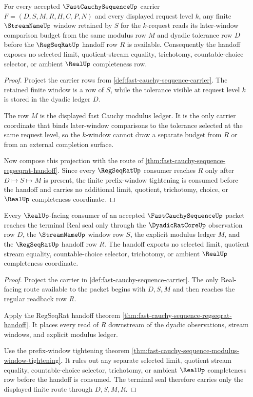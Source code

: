 \begin{theorem}
\label{thm:fast-cauchy-sequence-modulus-window-tightening}
For every accepted $\FastCauchySequenceUp$ carrier $F=(D,S,M,R,H,C,P,N)$ and every displayed request level $k$, any finite $\StreamNameUp$ window retained by $S$ for the $k$-request reads its later-window comparison budget from the same modulus row $M$ and dyadic tolerance row $D$ before the $\RegSeqRatUp$ handoff row $R$ is available. Consequently the handoff exposes no selected limit, quotient-stream equality, trichotomy, countable-choice selector, or ambient $\RealUp$ completeness row.
\end{theorem}
\begin{proof}
Project the carrier rows from \autoref{def:fast-cauchy-sequence-carrier}. The retained finite window is a row of $S$, while the tolerance visible at request level $k$ is stored in the dyadic ledger $D$.

The row $M$ is the displayed fast Cauchy modulus ledger. It is the only carrier coordinate that binds later-window comparisons to the tolerance selected at the same request level, so the $k$-window cannot draw a separate budget from $R$ or from an external completion surface.

Now compose this projection with the route of \autoref{thm:fast-cauchy-sequence-regseqrat-handoff}. Since every $\RegSeqRatUp$ consumer reaches $R$ only after $D\longmapsto S\longmapsto M$ is present, the finite prefix-window tightening is consumed before the handoff and carries no additional limit, quotient, trichotomy, choice, or $\RealUp$ completeness coordinate.
\end{proof}

\begin{theorem}
\label{thm:fast-cauchy-sequence-real-seal-handoff}
Every $\RealUp$-facing consumer of an accepted $\FastCauchySequenceUp$ packet reaches the terminal Real seal only through the $\DyadicRatCoreUp$ observation row $D$, the $\StreamNameUp$ window row $S$, the explicit modulus ledger $M$, and the $\RegSeqRatUp$ handoff row $R$. The handoff exports no selected limit, quotient stream equality, countable-choice selector, trichotomy, or ambient $\RealUp$ completeness coordinate.
\end{theorem}
\begin{proof}
Project the carrier in \autoref{def:fast-cauchy-sequence-carrier}. The only Real-facing route available to the packet begins with $D,S,M$ and then reaches the regular readback row $R$.

Apply the RegSeqRat handoff theorem \autoref{thm:fast-cauchy-sequence-regseqrat-handoff}. It places every read of $R$ downstream of the dyadic observations, stream windows, and explicit modulus ledger.

Use the prefix-window tightening theorem \autoref{thm:fast-cauchy-sequence-modulus-window-tightening}. It rules out any separate selected limit, quotient stream equality, countable-choice selector, trichotomy, or ambient $\RealUp$ completeness row before the handoff is consumed. The terminal seal therefore carries only the displayed finite route through $D,S,M,R$.
\end{proof}

